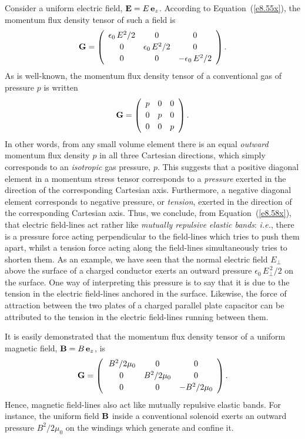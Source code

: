 Consider a uniform electric field, ${\bf E} = E\,{\bf e}_z$. 
According to Equation~(\ref{e8.55x}), the momentum flux density
tensor of such a field is
\begin{equation}\label{e8.58x}
{\bf G} = \left(\begin{array}{ccc}\epsilon_0\,E^2/2&0&0\\[0.5ex]
0&\epsilon_0\,E^2/2&0\\[0.5ex]
0&0&-\epsilon_0\,E^2/2\end{array}
\right).
\end{equation}
As is well-known, the momentum flux density tensor of a conventional gas of pressure $p$ is
written
\begin{equation}
{\bf G} = \left(\begin{array}{ccc} p&0&0\\[0.5ex]
0&p&0\\[0.5ex]
0&0&p\end{array}
\right).
\end{equation}
In other words,  from any small volume element there is an equal {\em outward}\/ momentum flux density $p$ in all three Cartesian directions, which simply corresponds to an {\em isotropic}\/ gas pressure, $p$.  This suggests that
a positive diagonal element in a momentum stress tensor corresponds to
a {\em pressure}\/ exerted in the direction of the corresponding Cartesian axis. Furthermore, a negative diagonal element corresponds to negative
pressure, or {\em tension}, exerted in the direction of the corresponding
Cartesian axis. Thus, we conclude, from  Equation~(\ref{e8.58x}), that
electric field-lines act rather like {\em mutually repulsive elastic bands}:
{\em i.e.}, there is a pressure force acting perpendicular to the field-lines which tries to
push them apart, whilst a tension force acting along the field-lines simultaneously tries to shorten them. As an example, we have seen that the normal
electric field $E_\perp$ above the surface of a charged conductor exerts an outward
pressure $\epsilon_0\,E_\perp^{\,2}/2$ on the surface. One way of interpreting this pressure is to say that it is due to the tension in the
electric field-lines anchored in the surface. Likewise, the force of
attraction between the two plates of a charged parallel plate capacitor
can be attributed to the tension in the electric field-lines running
between them.

It is easily demonstrated that the momentum flux density tensor of
a uniform magnetic field, ${\bf B} = B\,{\bf e}_z$, is
\begin{equation}
{\bf G} = \left(\begin{array}{ccc}\,B^2/2\mu_0&0&0\\[0.5ex]
0&B^2/2\mu_0&0\\[0.5ex]
0&0&-B^2/2\mu_0\end{array}
\right).
\end{equation}
Hence, magnetic field-lines also act like mutually repulsive elastic bands.
For instance, the uniform field ${\bf B}$ inside a conventional solenoid exerts an
outward pressure $B^2/2\mu_0$ on the windings which generate and confine it.

